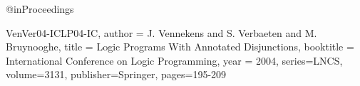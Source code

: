 @inProceedings{VenVer04-ICLP04-IC,
   author =      {J. Vennekens and S. Verbaeten and M. Bruynooghe},
   title =       {Logic Programs With Annotated Disjunctions},
  booktitle =  {International Conference on Logic Programming},
   year =        {2004},
      series={LNCS},
   volume={3131},
   publisher={Springer},
   pages={195-209}

   
}